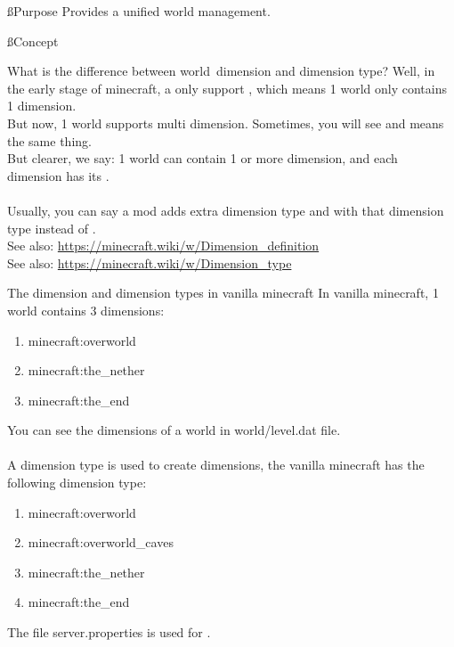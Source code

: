 
\ss{Purpose}
Provides a unified world management.

\ss{Concept}

\begin{example}{What is the difference between world\tcomma\ dimension and dimension type?}
    Well, in the early stage of minecraft, a  only support , which means 1 world only contains 1 dimension.\\
    But now, 1 world supports multi dimension.
    Sometimes, you will see  and  means the same thing.\\
    But clearer, we say: 1 world can contain 1 or more dimension, and each dimension has its .\\\\
    Usually, you can say a mod adds extra dimension type and  with that dimension type instead of .\\
    See also: \url{https://minecraft.wiki/w/Dimension_definition}\\
    See also: \url{https://minecraft.wiki/w/Dimension_type}
\end{example}

\begin{tips}{The dimension and dimension types in vanilla minecraft}
    In vanilla minecraft, 1 world contains 3 dimensions:
    \begin{enumerate}
        \item minecraft:overworld
        \item minecraft:the\_nether
        \item minecraft:the\_end
    \end{enumerate}
    You can see the dimensions of a world in world/level.dat file.
    \\\\
    A dimension type is used to create dimensions, the vanilla minecraft has the following dimension type:
    \begin{enumerate}
        \item minecraft:overworld
        \item minecraft:overworld\_caves
        \item minecraft:the\_nether
        \item minecraft:the\_end
    \end{enumerate}

    The file server.properties is used for .
\end{tips}

